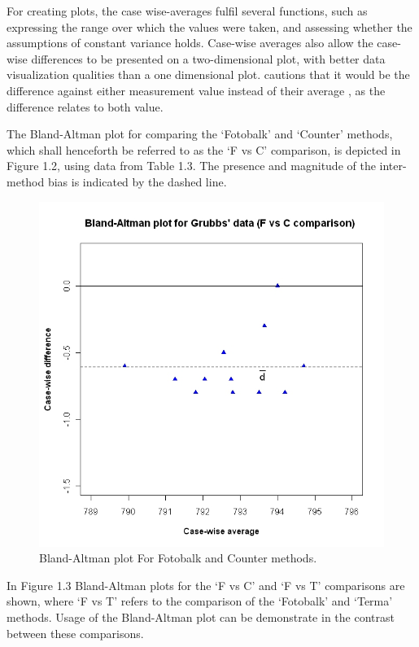 \documentclass[12pt, a4paper]{report}
\begin{document}
For creating plots, the case wise-averages fulfil several
functions, such as expressing the range over which the values were
taken, and assessing whether the assumptions of constant variance
holds. Case-wise averages also allow the case-wise differences to
be presented on a two-dimensional plot, with better data
visualization qualities than a one dimensional plot. \citet{BA86}
cautions that it would be the difference against either
measurement value instead of their average , as the difference
relates to both value.

The Bland-Altman plot for comparing the `Fotobalk' and `Counter'
methods, which shall henceforth be referred to as the `F vs C'
comparison,  is depicted in Figure 1.2, using data from Table 1.3.
The presence and magnitude of the inter-method bias is indicated
by the dashed line.

\begin{figure}[h!]
\begin{center}
  \includegraphics[width=120mm]{GrubbsBAplot-noLOA.jpeg}
  \caption{Bland-Altman plot For Fotobalk and Counter methods.}\label{GrubbsBA-noLOA}
\end{center}
\end{figure}



In Figure 1.3 Bland-Altman plots for the `F vs C' and `F vs T'
comparisons are shown, where `F vs T' refers to the comparison of
the `Fotobalk' and `Terma' methods. Usage of the Bland-Altman plot
can be demonstrate in the contrast between these comparisons.
\end{document}
